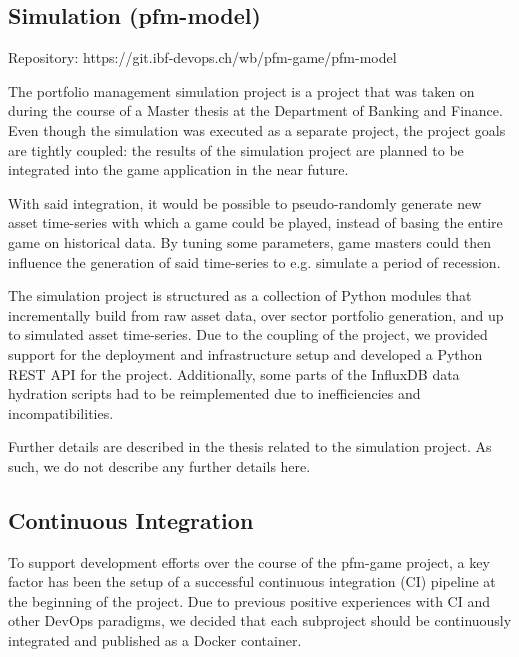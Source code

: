 \subsection{Simulation (pfm-model)}

Repository: https://git.ibf-devops.ch/wb/pfm-game/pfm-model

The portfolio management simulation project is a project that was taken on during the course of a Master thesis at the Department of Banking and Finance. Even though the simulation was executed as a separate project, the project goals are tightly coupled: the results of the simulation project are planned to be integrated into the game application in the near future.

With said integration, it would be possible to pseudo-randomly generate new asset time-series with which a game could be played, instead of basing the entire game on historical data. By tuning some parameters, game masters could then influence the generation of said time-series to e.g. simulate a period of recession.

The simulation project is structured as a collection of Python modules that incrementally build from raw asset data, over sector portfolio generation, and up to simulated asset time-series. Due to the coupling of the project, we provided support for the deployment and infrastructure setup and developed a Python REST API for the project. Additionally, some parts of the InfluxDB data hydration scripts had to be reimplemented due to inefficiencies and incompatibilities.

Further details are described in the thesis related to the simulation project. As such, we do not describe any further details here.


\subsection{Continuous Integration}

To support development efforts over the course of the pfm-game project, a key factor has been the setup of a successful continuous integration (CI) pipeline at the beginning of the project. Due to previous positive experiences with CI and other DevOps paradigms, we decided that each subproject should be continuously integrated and published as a Docker container.